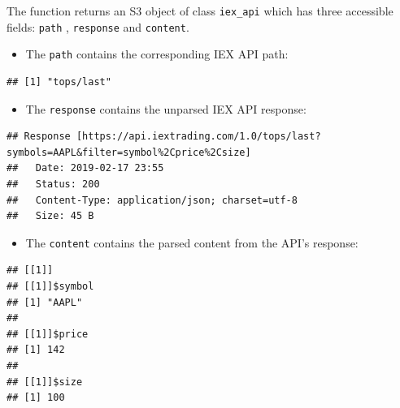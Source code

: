 \documentclass[]{book}
\newenvironment{Shaded}{\begin{snugshade}}{\end{snugshade}}
\newcommand{\OperatorTok}[1]{\textcolor[rgb]{0.81,0.36,0.00}{\textbf{#1}}}
\newcommand{\NormalTok}[1]{#1}
\providecommand{\tightlist}{%
  \setlength{\itemsep}{0pt}\setlength{\parskip}{0pt}}
\theoremstyle{definition}
\theoremstyle{definition}
\theoremstyle{definition}
\theoremstyle{remark}
\begin{document}
The function returns an S3 object of class \texttt{iex\_api} which has
three accessible fields: \texttt{path} , \texttt{response} and
\texttt{content}.

\begin{itemize}
\tightlist
\item
  The \texttt{path} contains the corresponding IEX API path:
\end{itemize}

\begin{Shaded}
\end{Shaded}

\begin{verbatim}
## [1] "tops/last"
\end{verbatim}

\begin{itemize}
\tightlist
\item
  The \texttt{response} contains the unparsed IEX API response:
\end{itemize}

\begin{Shaded}
\end{Shaded}

\begin{verbatim}
## Response [https://api.iextrading.com/1.0/tops/last?symbols=AAPL&filter=symbol%2Cprice%2Csize]
##   Date: 2019-02-17 23:55
##   Status: 200
##   Content-Type: application/json; charset=utf-8
##   Size: 45 B
\end{verbatim}

\begin{itemize}
\tightlist
\item
  The \texttt{content} contains the parsed content from the API's
  response:
\end{itemize}

\begin{Shaded}
\end{Shaded}

\begin{verbatim}
## [[1]]
## [[1]]$symbol
## [1] "AAPL"
## 
## [[1]]$price
## [1] 142
## 
## [[1]]$size
## [1] 100
\end{verbatim}
\end{document}
